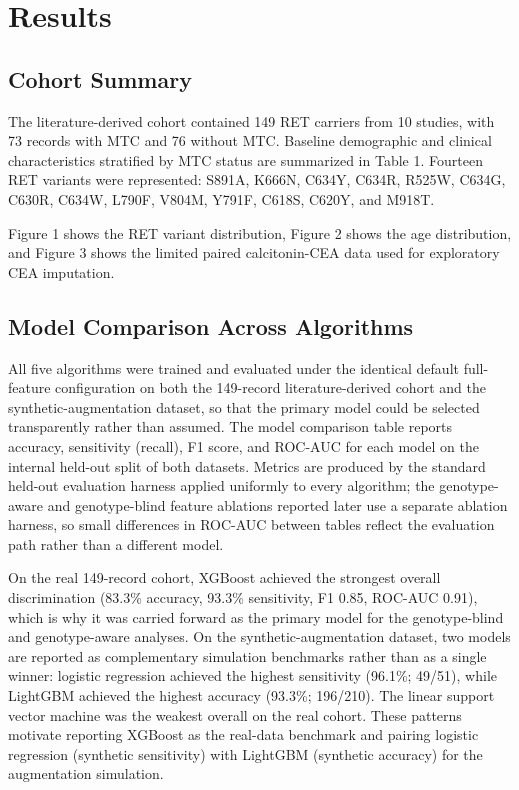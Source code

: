 \documentclass[12pt]{article}
\begin{document}
\section{Results}

\subsection{Cohort Summary}
The literature-derived cohort contained 149 RET carriers from 10 studies, with 73 records with MTC and 76 without MTC. Baseline demographic and clinical characteristics stratified by MTC status are summarized in Table 1. Fourteen RET variants were represented: S891A, K666N, C634Y, C634R, R525W, C634G, C630R, C634W, L790F, V804M, Y791F, C618S, C620Y, and M918T.

Figure 1 shows the RET variant distribution, Figure 2 shows the age distribution, and Figure 3 shows the limited paired calcitonin-CEA data used for exploratory CEA imputation.

\subsection{Model Comparison Across Algorithms}
All five algorithms were trained and evaluated under the identical default full-feature configuration on both the 149-record literature-derived cohort and the synthetic-augmentation dataset, so that the primary model could be selected transparently rather than assumed. The model comparison table reports accuracy, sensitivity (recall), F1 score, and ROC-AUC for each model on the internal held-out split of both datasets. Metrics are produced by the standard held-out evaluation harness applied uniformly to every algorithm; the genotype-aware and genotype-blind feature ablations reported later use a separate ablation harness, so small differences in ROC-AUC between tables reflect the evaluation path rather than a different model.

On the real 149-record cohort, XGBoost achieved the strongest overall discrimination (83.3\% accuracy, 93.3\% sensitivity, F1 0.85, ROC-AUC 0.91), which is why it was carried forward as the primary model for the genotype-blind and genotype-aware analyses. On the synthetic-augmentation dataset, two models are reported as complementary simulation benchmarks rather than as a single winner: logistic regression achieved the highest sensitivity (96.1\%; 49/51), while LightGBM achieved the highest accuracy (93.3\%; 196/210). The linear support vector machine was the weakest overall on the real cohort. These patterns motivate reporting XGBoost as the real-data benchmark and pairing logistic regression (synthetic sensitivity) with LightGBM (synthetic accuracy) for the augmentation simulation.
\end{document}
